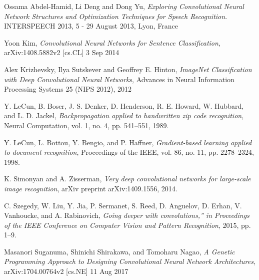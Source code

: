 \documentclass[conference]{IEEEtran}
\begin{document}
%
%
%
\begin{thebibliography}{}

Ossama Abdel-Hamid, Li Deng and Dong Yu, \emph{Exploring Convolutional Neural Network Structures and Optimization Techniques for Speech Recognition}. INTERSPEECH 2013, 5 - 29 August 2013, Lyon, France

Yoon Kim, \emph{Convolutional Neural Networks for Sentence Classification}, arXiv:1408.5882v2 [cs.CL] 3 Sep 2014

Alex Krizhevsky, Ilya Sutskever and Geoffrey E. Hinton, \emph{ImageNet Classification with Deep Convolutional Neural Networks}, Advances in Neural Information Processing Systems 25 (NIPS 2012), 2012

Y. LeCun, B. Boser, J. S. Denker, D. Henderson, R. E. Howard, W. Hubbard, and L. D. Jackel, \emph{Backpropagation applied to handwritten zip code recognition}, Neural Computation, vol. 1, no. 4, pp. 541–551, 1989.

Y. LeCun, L. Bottou, Y. Bengio, and P. Haffner, \emph{Gradient-based learning applied to document recognition}, Proceedings of the IEEE, vol. 86, no. 11, pp. 2278–2324, 1998.

K. Simonyan and A. Zisserman, \emph{Very deep convolutional networks for large-scale image recognition}, arXiv preprint arXiv:1409.1556, 2014.

C. Szegedy, W. Liu, Y. Jia, P. Sermanet, S. Reed, D. Anguelov, D. Erhan, V. Vanhoucke, and A. Rabinovich, \emph{Going deeper with convolutions,” in Proceedings of the IEEE Conference on Computer Vision and Pattern Recognition}, 2015, pp. 1–9.

Masanori Suganuma, Shinichi Shirakawa, and Tomoharu Nagao, \emph{A Genetic Programming Approach to Designing Convolutional Neural Network Architectures}, arXiv:1704.00764v2  [cs.NE]  11 Aug 2017


\end{thebibliography}
\end{document}
